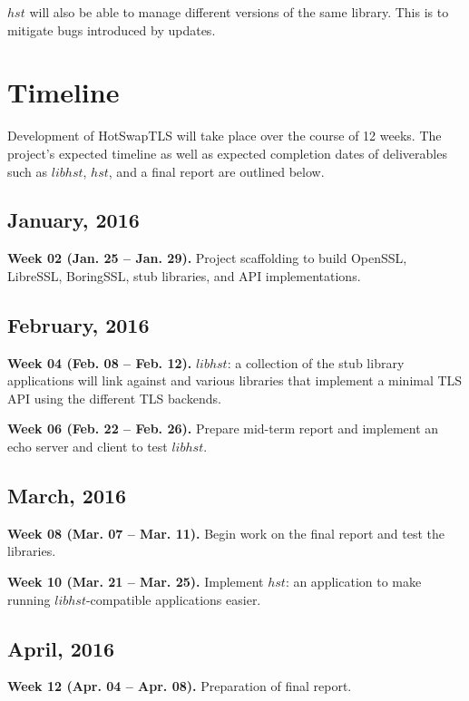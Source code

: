 \documentclass{acm_proc_article-sp}
\begin{document}
$hst$ will also be able to manage different versions of the same library. This
is to mitigate bugs introduced by updates.

\pagebreak

\section{Timeline}\label{Sec:Time}

Development of HotSwapTLS will take place over the course of 12 weeks. The
project's expected timeline as well as expected completion dates of deliverables
such as $libhst$, $hst$, and a final report are outlined below.

\subsection{January, 2016}

\textbf{Week 02 (Jan. 25 -- Jan. 29).} Project scaffolding to build OpenSSL,
LibreSSL, BoringSSL, stub libraries, and API implementations.

\subsection{February, 2016}

\textbf{Week 04 (Feb. 08 -- Feb. 12).} $libhst$: a collection of the stub
library applications will link against and various libraries that implement a
minimal TLS API using the different TLS backends.

\textbf{Week 06 (Feb. 22 -- Feb. 26).} Prepare mid-term report and implement an
echo server and client to test $libhst$.

\subsection{March, 2016}

\textbf{Week 08 (Mar. 07 -- Mar. 11).} Begin work on the final report and test
the libraries.

\textbf{Week 10 (Mar. 21 -- Mar. 25).} Implement $hst$: an application to make
running $libhst$-compatible applications easier.

\subsection{April, 2016}

\textbf{Week 12 (Apr. 04 -- Apr. 08).} Preparation of final report.




\balancecolumns
\end{document}
